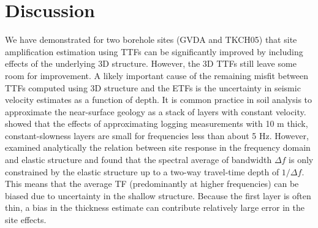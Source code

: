 \section{Discussion}\label{etf:discussion}
We have demonstrated for two borehole sites (GVDA and TKCH05) that site amplification estimation using TTFs can be significantly improved by including effects of the underlying 3D structure. However, the 3D TTFs still leave some room for improvement. A likely important cause of the remaining misfit between TTFs computed using 3D structure and the ETFs is the uncertainty in seismic velocity estimates as a function of depth. It is common practice in soil analysis to approximate the near-surface geology as a stack of layers with constant velocity. \citet{booreUsingSurfacesourceDownholereceiver2007} showed that the effects of approximating logging measurements with 10 m thick, constant-slowness layers are small for frequencies less than about 5 Hz. However, \citet{dayRMSResponseOnedimensional1996} examined analytically the relation between site response in the frequency domain and elastic structure and found that the spectral average of bandwidth ${\Delta{f}}$ is only constrained by the elastic structure up to a two-way travel-time depth of ${1/\Delta{f}}$. This means that the average TF (predominantly at higher frequencies) can be biased due to uncertainty in the shallow structure. Because the first layer is often thin, a bias in the thickness estimate can contribute relatively large error in the site effects.

